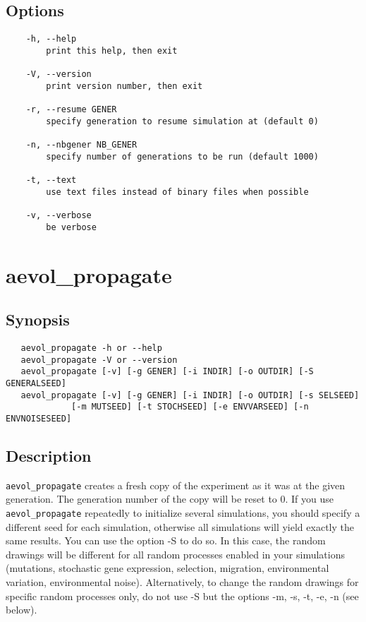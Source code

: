 \subsection*{Options}
\begin{verbatim}
	-h, --help
    	print this help, then exit

	-V, --version
	    print version number, then exit

	-r, --resume GENER
	    specify generation to resume simulation at (default 0)

	-n, --nbgener NB_GENER
	    specify number of generations to be run (default 1000)

	-t, --text
	    use text files instead of binary files when possible

	-v, --verbose
	    be verbose
\end{verbatim}

\newpage


\section{aevol\_propagate}
\label{sec:aevol-propagate}

\subsection*{Synopsis}
\begin{verbatim}
   aevol_propagate -h or --help
   aevol_propagate -V or --version
   aevol_propagate [-v] [-g GENER] [-i INDIR] [-o OUTDIR] [-S GENERALSEED]
   aevol_propagate [-v] [-g GENER] [-i INDIR] [-o OUTDIR] [-s SELSEED] 
             [-m MUTSEED] [-t STOCHSEED] [-e ENVVARSEED] [-n ENVNOISESEED]
\end{verbatim}

\subsection*{Description}
\verb?aevol_propagate? creates a fresh copy of the experiment as it was at the given generation. The generation number of the copy will be reset to 0. If you use \verb?aevol_propagate? repeatedly to initialize several simulations, you should specify a different seed for each simulation, otherwise all simulations  will  yield  exactly  the same results. You can use the option -S to do so. In this case, the random drawings will be different for all random processes enabled in your  simulations  (mutations, stochastic gene expression, selection, migration, environmental variation, environmental noise). Alternatively, to change the random drawings for specific  random  processes only, do not use -S but the options -m, -s, -t, -e, -n (see below).

